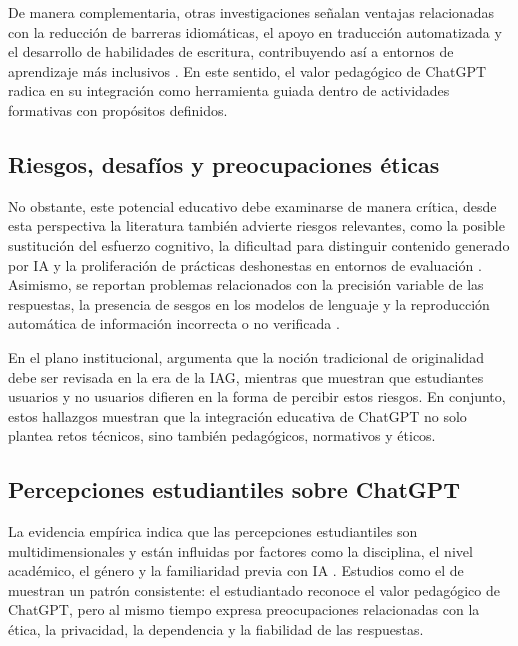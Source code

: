 \documentclass[spanish]{textolivre}
\begin{document}
De manera complementaria, otras investigaciones señalan ventajas relacionadas con la reducción de barreras idiomáticas, el apoyo en traducción automatizada y el desarrollo de habilidades de escritura, contribuyendo así a entornos de aprendizaje más inclusivos \cite{WangXuLiu2024}. En este sentido, el valor pedagógico de ChatGPT radica en su integración como herramienta guiada dentro de actividades formativas con propósitos definidos.

\subsection{Riesgos, desafíos y preocupaciones éticas}

No obstante, este potencial educativo debe examinarse de manera crítica, desde esta perspectiva la literatura también advierte riesgos relevantes, como la posible sustitución del esfuerzo cognitivo, la dificultad para distinguir contenido generado por IA y la proliferación de prácticas deshonestas en entornos de evaluación \cite{Cotton2024,Lee2024}. Asimismo, se reportan problemas relacionados con la precisión variable de las respuestas, la presencia de sesgos en los modelos de lenguaje y la reproducción automática de información incorrecta o no verificada \cite{Dwivedi2023,Kasneci2023}.

En el plano institucional, \textcite{Luo2024} argumenta que la noción tradicional de originalidad debe ser revisada en la era de la IAG, mientras que \textcite{BlahopoulouOrtizBonnin2025} muestran que estudiantes usuarios y no usuarios difieren en la forma de percibir estos riesgos. En conjunto, estos hallazgos muestran que la integración educativa de ChatGPT no solo plantea retos técnicos, sino también pedagógicos, normativos y éticos.

\subsection{Percepciones estudiantiles sobre ChatGPT}

La evidencia empírica indica que las percepciones estudiantiles son multidimensionales y están influidas por factores como la disciplina, el nivel académico, el género y la familiaridad previa con IA \cite{KlimovaDeCampos2024,StohrOuMalmstrom2024}. Estudios como el de \textcite{Ravselj2025} muestran un patrón consistente: el estudiantado reconoce el valor pedagógico de ChatGPT, pero al mismo tiempo expresa preocupaciones relacionadas con la ética, la privacidad, la dependencia y la fiabilidad de las respuestas.
\end{document}
